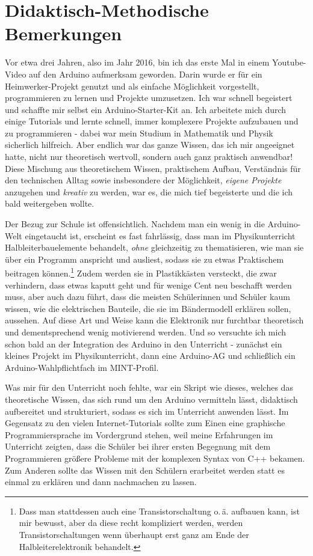 \chapter{Didaktisch-Methodische Bemerkungen}\label{kap:didaktik}

Vor etwa drei Jahren, also im Jahr 2016, bin ich das erste Mal in einem Youtube-Video auf den Arduino aufmerksam geworden. Darin wurde er für ein Heimwerker-Projekt genutzt und als einfache Möglichkeit vorgestellt, programmieren zu lernen und Projekte umzusetzen. Ich war schnell begeistert und schaffte mir selbst ein Arduino-Starter-Kit an. Ich arbeitete mich durch einige Tutorials und lernte schnell, immer komplexere Projekte aufzubauen und zu programmieren - dabei war mein Studium in Mathematik und Physik sicherlich hilfreich. Aber endlich war das ganze Wissen, das ich mir angeeignet hatte, nicht nur theoretisch wertvoll, sondern auch ganz praktisch anwendbar! Diese Mischung aus theoretischem Wissen, praktischem Aufbau, Verständnis für den technischen Alltag sowie insbesondere der Möglichkeit, \emph{eigene Projekte} anzugehen und \emph{kreativ} zu werden, war es, die mich tief begeisterte und die ich bald weitergeben wollte.

Der Bezug zur Schule ist offensichtlich. Nachdem man ein wenig in die Arduino-Welt eingetaucht ist, erscheint es fast fahrlässig, dass man im Physikunterricht Halbleiterbauelemente behandelt, \emph{ohne} gleichzeitig zu thematisieren, wie man sie über ein Programm anspricht und ausliest, sodass sie zu etwas Praktischem beitragen können.\footnote{Dass man stattdessen auch eine Transistorschaltung o.\,ä. aufbauen kann, ist mir bewusst, aber da diese recht kompliziert werden, werden Transistorschaltungen wenn überhaupt erst ganz am Ende der Halbleiterelektronik behandelt.} Zudem werden sie in Plastikkästen versteckt, die zwar verhindern, dass etwas kaputt geht und für wenige Cent neu beschafft werden muss, aber auch dazu führt, dass die meisten Schülerinnen und Schüler kaum wissen, wie die elektrischen Bauteile, die sie im Bändermodell erklären sollen, aussehen. Auf diese Art und Weise kann die Elektronik nur furchtbar theoretisch und dementsprechend wenig motivierend werden. Und so versuchte ich mich schon bald an der Integration des Arduino in den Unterricht - zunächst ein kleines Projekt im Physikunterricht, dann eine Arduino-AG und schließlich ein Arduino-Wahlpflichtfach im MINT-Profil.

Was mir für den Unterricht noch fehlte, war ein Skript wie dieses, welches das theoretische Wissen, das sich rund um den Arduino vermitteln lässt, didaktisch aufbereitet und strukturiert, sodass es sich im Unterricht anwenden lässt. Im Gegensatz zu den vielen Internet-Tutorials sollte zum Einen eine graphische Programmiersprache im Vordergrund stehen, weil meine Erfahrungen im Unterricht zeigten, dass die Schüler bei ihrer ersten Begegnung mit dem Programmieren größere Probleme mit der komplexen Syntax von C++ bekamen. Zum Anderen sollte das Wissen mit den Schülern erarbeitet werden statt es einmal zu erklären und dann nachmachen zu lassen.

